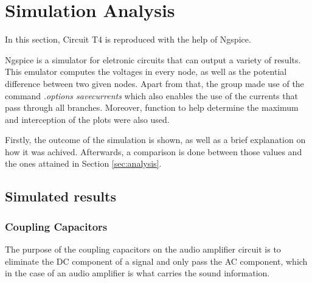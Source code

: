 
\section{Simulation Analysis}
\label{sec:simulation}



In this section, Circuit T4 is reproduced with the help of Ngspice.

Ngspice is a simulator for eletronic circuits that can output a variety of results.
This emulator computes the voltages in every node, as well as the potential difference
between two given nodes. Apart from that, the group made use of the command
{\em .options savecurrents} which also enables the use of the currents that pass
through all branches. Moreover, function to help determine the maximum and interception
of the plots were also used.

Firstly, the outcome of the simulation is shown, as well as a brief explanation
on how it was achived. Afterwards, a comparison is done between those values and
the ones attained in Section \ref{sec:analysis}.




\subsection{Simulated results}
\label{subsec:sim_res}

\subsubsection{Coupling Capacitors}

The purpose of the coupling capacitors on the audio amplifier circuit is to eliminate the DC component of a signal and only pass the AC component, which in the case of an audio amplifier is what carries the sound information.

